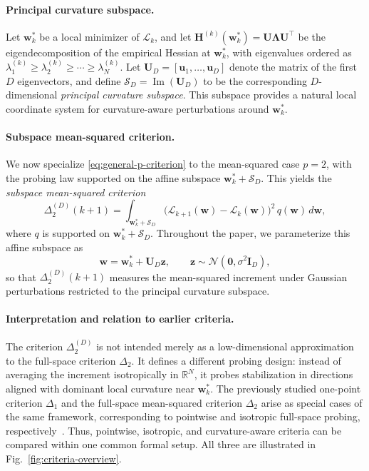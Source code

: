 \documentclass[10pt]{article}
\theoremstyle{plain}
\theoremstyle{remark}
\begin{document}
\paragraph{Principal curvature subspace.}
Let $\mathbf w_k^*$ be a local minimizer of $\mathcal L_k$, and let $\mathbf H^{(k)}(\mathbf w_k^*) = \mathbf U \mathbf \Lambda \mathbf U^\top$ be the eigendecomposition of the empirical Hessian at $\mathbf w_k^*$, with eigenvalues ordered as $\lambda_1^{(k)} \ge \lambda_2^{(k)} \ge \cdots \ge \lambda_N^{(k)}$. Let $\mathbf U_D=[\mathbf u_1,\dots,\mathbf u_D]$ denote the matrix of the first $D$ eigenvectors, and define $\mathcal S_D=\operatorname{Im}(\mathbf U_D)$ to be the corresponding $D$-dimensional \emph{principal curvature subspace}.
This subspace provides a natural local coordinate system for curvature-aware perturbations around $\mathbf w_k^*$.

\paragraph{Subspace mean-squared criterion.}
We now specialize \eqref{eq:general-p-criterion} to the mean-squared case $p=2$, with the probing law supported on the affine subspace $\mathbf w_k^*+\mathcal S_D$.
This yields the \emph{subspace mean-squared criterion}
\begin{equation}
\label{eq:delta2-subspace-method}
\Delta_2^{(D)}(k+1)
=
\int_{\mathbf w_k^*+\mathcal S_D}
\bigl(
\mathcal L_{k+1}(\mathbf w)-\mathcal L_k(\mathbf w)
\bigr)^2
\, q(\mathbf w)\, d\mathbf w,
\end{equation}
where $q$ is supported on $\mathbf w_k^*+\mathcal S_D$.
Throughout the paper, we parameterize this affine subspace as
\[
\mathbf w=\mathbf w_k^*+\mathbf U_D\mathbf z,
\qquad
\mathbf z\sim\mathcal N(\mathbf 0,\sigma^2\mathbf I_D),
\]
so that $\Delta_2^{(D)}(k+1)$ measures the mean-squared increment under Gaussian perturbations restricted to the principal curvature subspace.

\paragraph{Interpretation and relation to earlier criteria.}
The criterion $\Delta_2^{(D)}$ is not intended merely as a low-dimensional approximation to the full-space criterion $\Delta_2$.
It defines a different probing design: instead of averaging the increment isotropically in $\mathbb R^N$, it probes stabilization in directions aligned with dominant local curvature near $\mathbf w_k^*$.
The previously studied one-point criterion $\Delta_1$ and the full-space mean-squared criterion $\Delta_2$ arise as special cases of the same framework, corresponding to pointwise and isotropic full-space probing, respectively~\citep{author:delta1,author:delta2}.
Thus, pointwise, isotropic, and curvature-aware criteria can be compared within one common formal setup.
All three are illustrated in Fig.~\ref{fig:criteria-overview}.
\end{document}
